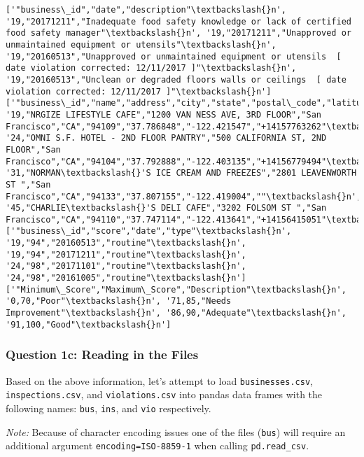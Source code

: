 \documentclass[11pt]{article}
\begin{document}
    \begin{Verbatim}[commandchars=\\\{\}]
['"business\_id","date","description"\textbackslash{}n', '19,"20171211","Inadequate food safety knowledge or lack of certified food safety manager"\textbackslash{}n', '19,"20171211","Unapproved or unmaintained equipment or utensils"\textbackslash{}n', '19,"20160513","Unapproved or unmaintained equipment or utensils  [ date violation corrected: 12/11/2017 ]"\textbackslash{}n', '19,"20160513","Unclean or degraded floors walls or ceilings  [ date violation corrected: 12/11/2017 ]"\textbackslash{}n']
['"business\_id","name","address","city","state","postal\_code","latitude","longitude","phone\_number"\textbackslash{}n', '19,"NRGIZE LIFESTYLE CAFE","1200 VAN NESS AVE, 3RD FLOOR","San Francisco","CA","94109","37.786848","-122.421547","+14157763262"\textbackslash{}n', '24,"OMNI S.F. HOTEL - 2ND FLOOR PANTRY","500 CALIFORNIA ST, 2ND  FLOOR","San Francisco","CA","94104","37.792888","-122.403135","+14156779494"\textbackslash{}n', '31,"NORMAN\textbackslash{}'S ICE CREAM AND FREEZES","2801 LEAVENWORTH ST ","San Francisco","CA","94133","37.807155","-122.419004",""\textbackslash{}n', '45,"CHARLIE\textbackslash{}'S DELI CAFE","3202 FOLSOM ST ","San Francisco","CA","94110","37.747114","-122.413641","+14156415051"\textbackslash{}n']
['"business\_id","score","date","type"\textbackslash{}n', '19,"94","20160513","routine"\textbackslash{}n', '19,"94","20171211","routine"\textbackslash{}n', '24,"98","20171101","routine"\textbackslash{}n', '24,"98","20161005","routine"\textbackslash{}n']
['"Minimum\_Score","Maximum\_Score","Description"\textbackslash{}n', '0,70,"Poor"\textbackslash{}n', '71,85,"Needs Improvement"\textbackslash{}n', '86,90,"Adequate"\textbackslash{}n', '91,100,"Good"\textbackslash{}n']

    \end{Verbatim}

    \subsubsection{Question 1c: Reading in the
Files}\label{question-1c-reading-in-the-files}

Based on the above information, let's attempt to load
\texttt{businesses.csv}, \texttt{inspections.csv}, and
\texttt{violations.csv} into pandas data frames with the following
names: \texttt{bus}, \texttt{ins}, and \texttt{vio} respectively.

\emph{Note:} Because of character encoding issues one of the files
(\texttt{bus}) will require an additional argument
\texttt{encoding=\textquotesingle{}ISO-8859-1\textquotesingle{}} when
calling \texttt{pd.read\_csv}.
\end{document}
